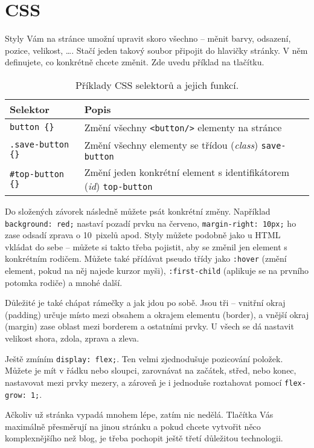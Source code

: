 \section{CSS}

Styly Vám na stránce umožní upravit skoro všechno – měnit barvy, odsazení, pozice, velikost, \ldots. Stačí jeden takový soubor připojit do hlavičky stránky. V něm definujete, co konkrétně chcete změnit. Zde uvedu příklad na tlačítku.

\begin{table}[h!]
\centering
\begin{tabular}{|>{\ttfamily}m{4cm}|m{8cm}|}
\hline
\textbf{Selektor} & \textbf{Popis} \\ \hline
\texttt{button \{\}} & Změní všechny \texttt{<button/>} elementy na stránce \\ \hline
\texttt{.save-button \{\}} & Změní všechny elementy se třídou (\textit{class}) \texttt{save-button} \\ \hline
\texttt{\#top-button \{\}} & Změní jeden konkrétní element s identifikátorem (\textit{id}) \texttt{top-button} \\ \hline
\end{tabular}
\caption{Příklady CSS selektorů a jejich funkcí.}
\end{table}

Do složených závorek následně můžete psát konkrétní změny. Například \texttt{background:~red;} nastaví pozadí prvku na červeno, \texttt{margin-right:~10px;} ho zase odsadí zprava o 10~pixelů apod. 
Styly můžete podobně jako u HTML vkládat do sebe – můžete si takto třeba pojistit, aby se změnil jen element s konkrétním rodičem. Můžete také přídávat pseudo třídy jako \texttt{:hover} (změní element, pokud na něj najede kurzor myši), \texttt{:first-child} (aplikuje se na prvního potomka rodiče) a mnohé další.

Důležité je také chápat rámečky a jak jdou po sobě. Jsou tři – vnitřní okraj (padding) určuje místo mezi obsahem a okrajem elementu (border), a vnější okraj (margin) zase oblast mezi borderem a ostatními prvky. U všech se dá nastavit velikost shora, zdola, zprava a zleva.

Ještě zmíním \texttt{display:~flex;}. Ten velmi zjednodušuje pozicování položek. Můžete je mít v řádku nebo sloupci, zarovnávat na začátek, střed, nebo konec, nastavovat mezi prvky mezery, a zároveň je i jednoduše roztahovat pomocí \texttt{flex-grow:~1;}.\cite{CSSFlexbox}

Ačkoliv už stránka vypadá mnohem lépe, zatím nic nedělá. Tlačítka Vás maximálně přesměrují na jinou stránku a pokud chcete vytvořit něco komplexnějšího než blog, je třeba pochopit ještě třetí důležitou technologii.